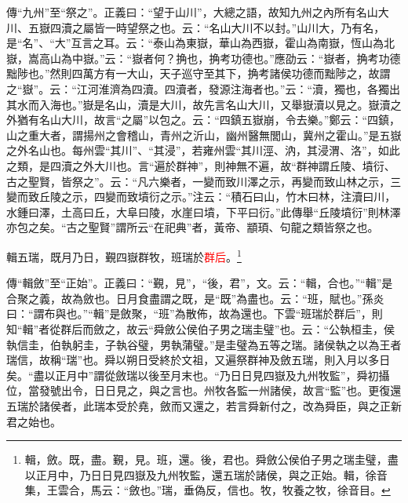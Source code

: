 {\noindent\zhuan{}\fzbyks 傳“九州”至“祭之”。正義曰：“望于山川”，大總之語，故知九州之內所有名山大川、五嶽四瀆之屬皆一時望祭之也。云：“名山大川不以封。”山川大，乃有名，是“名”、“大”互言之耳。云：“泰山為東嶽，華山為西嶽，霍山為南嶽，恆山為北嶽，嵩高山為中嶽。”云：“嶽者何？捔也，捔考功德也。”應劭云：“嶽者，捔考功德黜陟也。”然則四萬方有一大山，天子巡守至其下，捔考諸侯功德而黜陟之，故謂之“嶽”。云：“江河淮濟為四瀆。四瀆者，發源注海者也。”云：“瀆，獨也，各獨出其水而入海也。”嶽是名山，瀆是大川，故先言名山大川，又舉嶽瀆以見之。嶽瀆之外猶有名山大川，故言“之屬”以包之。云：“四鎮五嶽崩，令去樂。”鄭云：“四鎮，山之重大者，謂揚州之會稽山，青州之沂山，幽州醫無閭山，冀州之霍山。”是五嶽之外名山也。每州雲“其川”、“其浸”，若雍州雲“其川涇、汭，其浸渭、洛”，如此之類，是四瀆之外大川也。言“遍於群神”，則神無不遍，故“群神謂丘陵、墳衍、古之聖賢，皆祭之”。云：“凡六樂者，一變而致川澤之示，再變而致山林之示，三變而致丘陵之示，四變而致墳衍之示。”注云：“積石曰山，竹木曰林，注瀆曰川，水鍾曰澤，土高曰丘，大阜曰陵，水崖曰墳，下平曰衍。”此傳舉“丘陵墳衍”則林澤亦包之矣。“古之聖賢”謂所云“在祀典”者，黃帝、顓頊、句龍之類皆祭之也。 \par}

輯五瑞，既月乃日，覲四嶽群牧，班瑞於\textcolor{red}{群后}。\footnote{輯，斂。既，盡。覲，見。班，還。後，君也。舜斂公侯伯子男之瑞圭璧，盡以正月中，乃日日見四嶽及九州牧監，還五瑞於諸侯，與之正始。輯，徐音集，王雲合，馬云：“斂也。”瑞，垂偽反，信也。牧，牧養之牧，徐音目。}

{\noindent\zhuan{}\fzbyks 傳“輯斂”至“正始”。正義曰：“覲，見”，“後，君”，文。云：“輯，合也。”“輯”是合聚之義，故為斂也。日月食盡謂之既，是“既”為盡也。云：“班，賦也。”孫炎曰：“謂布與也。”“輯”是斂聚，“班”為散佈，故為還也。下雲“班瑞於群后”，則知“輯”者從群后而斂之，故云“舜斂公侯伯子男之瑞圭璧”也。云：“公執桓圭，侯執信圭，伯執躬圭，子執谷璧，男執蒲璧。”是圭璧為五等之瑞。諸侯執之以為王者瑞信，故稱“瑞”也。舜以朔日受終於文祖，又遍祭群神及斂五瑞，則入月以多日矣。“盡以正月中”謂從斂瑞以後至月末也。“乃日日見四嶽及九州牧監”，舜初攝位，當發號出令，日日見之，與之言也。州牧各監一州諸侯，故言“監”也。更復還五瑞於諸侯者，此瑞本受於堯，斂而又還之，若言舜新付之，改為舜臣，與之正新君之始也。 \par}

